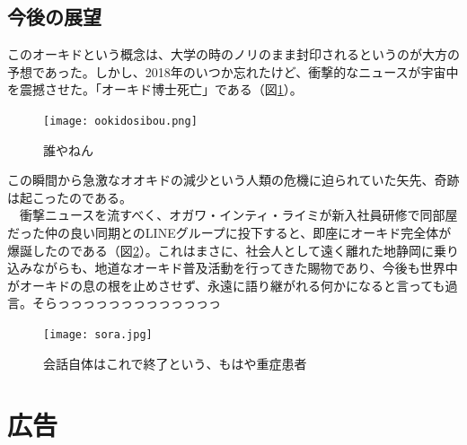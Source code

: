 \subsection{今後の展望}
このオーキドという概念は、大学の時のノリのまま封印されるというのが大方の予想であった。しかし、2018年のいつか忘れたけど、衝撃的なニュースが宇宙中を震撼させた。「オーキド博士死亡」である（図\ref{ookidosibou}）。

\begin{figure}[H]
\centering
\texttt{[image: ookidosibou.png]}
\caption{誰やねん}
\label{ookidosibou}
\end{figure}

この瞬間から急激なオオキドの減少という人類の危機に迫られていた矢先、奇跡は起こったのである。\\
　衝撃ニュースを流すべく、オガワ・インティ・ライミが新入社員研修で同部屋だった仲の良い同期とのLINEグループに投下すると、即座にオーキド完全体が爆誕したのである（図\ref{sora}）。これはまさに、社会人として遠く離れた地静岡に乗り込みながらも、地道なオーキド普及活動を行ってきた賜物であり、今後も世界中がオーキドの息の根を止めさせず、永遠に語り継がれる何かになると言っても過言。そらっっっっっっっっっっっっっ

\begin{figure}[H]
\centering
\texttt{[image: sora.jpg]}
\caption{会話自体はこれで終了という、もはや重症患者}
\label{sora}
\end{figure}

\newpage
\section{広告}
